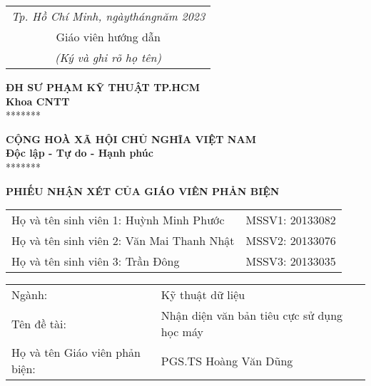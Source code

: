 \begin{flushright}
    \begin{tabular}{@{}c@{}}
        \textit{Tp. Hồ Chí Minh, ngày\qquad tháng\qquad năm 2023} \\
        Giáo viên hướng dẫn                                       \\
        \textit{(Ký và ghi rõ họ tên)}
    \end{tabular}
\end{flushright}
\newpage

% 
\thispagestyle{empty}
\noindent\begin{minipage}[t]{0.43\textwidth}
    \centering
    \fontsize{11pt}{16.5pt}
    \textbf{ĐH SƯ PHẠM KỸ THUẬT TP.HCM}\\
    \textbf{Khoa CNTT}\\
    *******
\end{minipage}
\begin{minipage}[t]{0.57\textwidth}
    \centering
    \fontsize{11pt}{16.5pt}
    \textbf{CỘNG HOÀ XÃ HỘI CHỦ NGHĨA VIỆT NAM}\\
    \textbf{Độc lập - Tự do - Hạnh phúc}\\
    *******
\end{minipage}
\begin{center}
    \fontsize{18pt}{27pt}
    \textbf{PHIẾU NHẬN XÉT CỦA GIÁO VIÊN PHẢN BIỆN}
\end{center}
\begin{table}[!h]
    \centering
    \begin{tabularx}{0.8\textwidth}{ X c }
        Họ và tên sinh viên 1: Huỳnh Minh Phước   & MSSV1: 20133082 \\
        Họ và tên sinh viên 2: Văn Mai Thanh Nhật & MSSV2: 20133076 \\
        Họ và tên sinh viên 3: Trần Đông          & MSSV3: 20133035 \\
    \end{tabularx}
\end{table}
\begin{center}
    \begin{tabular}{p{} p{}}
        Ngành: & Kỹ thuật dữ liệu\\
        Tên đề tài: & Nhận diện văn bản tiêu cực sử dụng học máy\\
        Họ và tên Giáo viên phản biện: & PGS.TS Hoàng Văn Dũng
    \end{tabular}
\end{center}
